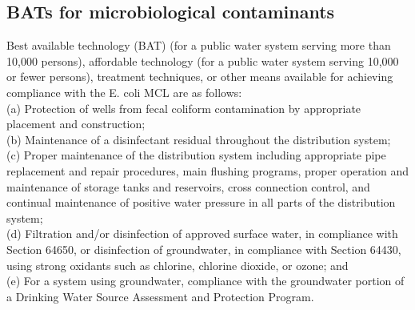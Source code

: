 \subsection{BATs for microbiological contaminants}  
Best available technology (BAT) (for a public water system serving more than 10,000 persons), affordable technology (for a public water system serving 10,000 or fewer persons), treatment techniques, or other means available for achieving compliance with the E. coli MCL are as follows:\\
(a) Protection of wells from fecal coliform contamination by appropriate placement and construction;\\
(b) Maintenance of a disinfectant residual throughout the distribution system;\\
(c) Proper maintenance of the distribution system including appropriate pipe replacement and repair procedures, main flushing programs, proper operation and maintenance of storage tanks and reservoirs, cross connection control, and continual maintenance of positive water pressure in all parts of the distribution system;\\
(d) Filtration and/or disinfection of approved surface water, in compliance with Section 64650, or disinfection of groundwater, in compliance with Section 64430, using strong oxidants such as chlorine, chlorine dioxide, or ozone; and\\
(e) For a system using groundwater, compliance with the groundwater portion of a Drinking Water Source Assessment and Protection Program.


